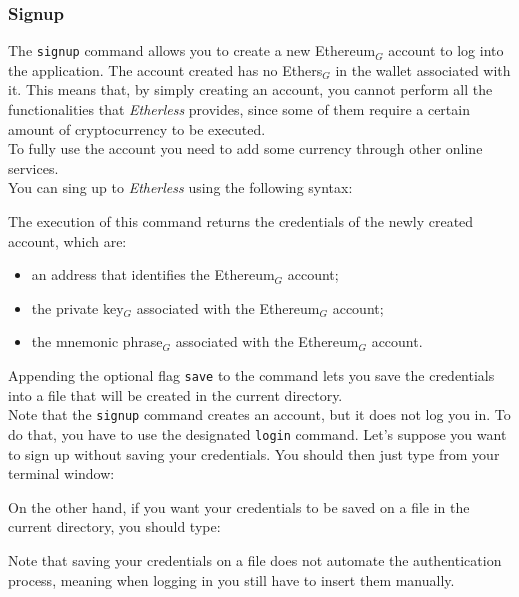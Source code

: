 \subsubsection{Signup}
The \texttt{signup} command allows you to create a new Ethereum$_{G}$ account to log into the application. The account created has no Ethers$_{G}$ in the wallet associated with it. This means that, by simply creating an account, you cannot perform all the functionalities that \textit{Etherless} provides, since some of them require a certain amount of cryptocurrency to be executed. \\
To fully use the account you need to add some currency through other online services. \\
You can sing up to \textit{Etherless} using the following syntax:
\begin{center}
\end{center}
\noindent The execution of this command returns the credentials of the newly created account, which are:
\begin{itemize}
	\item an address that identifies the Ethereum$_{G}$ account;
	\item the private key$_{G}$ associated with the Ethereum$_{G}$ account;
	\item the mnemonic phrase$_{G}$ associated with the Ethereum$_{G}$ account.
\end{itemize}
Appending the optional flag \texttt{save} to the command lets you save the credentials into a file that will be created in the current directory. \\
Note that the \texttt{signup} command creates an account, but it does not log you in. To do that, you have to use the designated \texttt{login} command.
Let's suppose you want to sign up without saving your credentials. You should then just type from your terminal window:
\begin{center}
\end{center}
On the other hand, if you want your credentials to be saved on a file in the current directory, you should type:
\begin{center}
\end{center}
Note that saving your credentials on a file does not automate the authentication process, meaning when logging in you still have to insert them manually.

